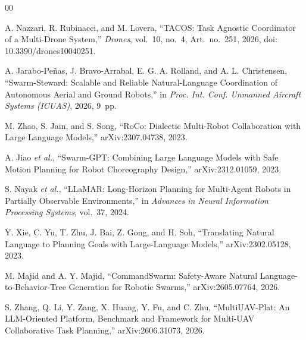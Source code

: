 \documentclass[conference]{IEEEtran}
\begin{document}
\begin{thebibliography}{00}

A. Nazzari, R. Rubinacci, and M. Lovera, ``TACOS: Task Agnostic Coordinator of
a Multi-Drone System,'' \emph{Drones}, vol.~10, no.~4, Art.~no.~251, 2026,
doi: 10.3390/drones10040251.

A. Jarabo-Pe\~nas, J. Bravo-Arrabal, E. G. A. Rolland, and A. L. Christensen,
``Swarm-Steward: Scalable and Reliable Natural-Language Coordination of
Autonomous Aerial and Ground Robots,'' in \emph{Proc. Int. Conf. Unmanned
Aircraft Systems (ICUAS)}, 2026, 9~pp.

M. Zhao, S. Jain, and S. Song, ``RoCo: Dialectic Multi-Robot Collaboration with
Large Language Models,'' arXiv:2307.04738, 2023.

A. Jiao \emph{et al.}, ``Swarm-GPT: Combining Large Language Models with Safe
Motion Planning for Robot Choreography Design,'' arXiv:2312.01059, 2023.

S. Nayak \emph{et al.}, ``LLaMAR: Long-Horizon Planning for Multi-Agent Robots
in Partially Observable Environments,'' in \emph{Advances in Neural
Information Processing Systems}, vol.~37, 2024.

Y. Xie, C. Yu, T. Zhu, J. Bai, Z. Gong, and H. Soh, ``Translating Natural
Language to Planning Goals with Large-Language Models,'' arXiv:2302.05128,
2023.

M. Majid and A. Y. Majid, ``CommandSwarm: Safety-Aware Natural
Language-to-Behavior-Tree Generation for Robotic Swarms,'' arXiv:2605.07764,
2026.

S. Zhang, Q. Li, Y. Zang, X. Huang, Y. Fu, and C. Zhu, ``MultiUAV-Plat: An
LLM-Oriented Platform, Benchmark and Framework for Multi-UAV Collaborative
Task Planning,'' arXiv:2606.31073, 2026.

\end{thebibliography}
\end{document}
